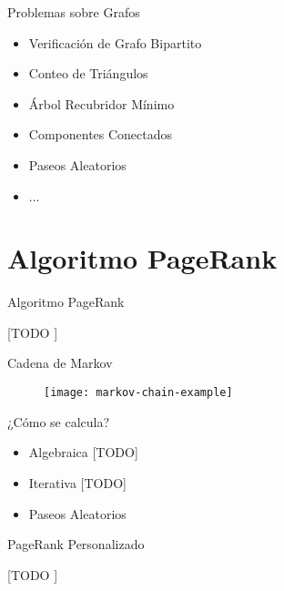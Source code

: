 \documentclass[12pt]{beamer}
\begin{document}
    \begin{frame}[fragile]{Problemas sobre Grafos}

      \begin{itemize}
        \item Verificación de Grafo Bipartito
        \item Conteo de Triángulos
        \item Árbol Recubridor Mínimo
        \item Componentes Conectados
        \item Paseos Aleatorios
        \item ...
      \end{itemize}

    \end{frame}

  \section{Algoritmo PageRank}

    \begin{frame}[fragile]{Algoritmo PageRank}

      [TODO ]

    \end{frame}

    \begin{frame}[fragile]{Cadena de Markov}

      \begin{figure}
        \texttt{[image: markov-chain-example]}
        \caption{}
        \label{}
      \end{figure}

    \end{frame}

    \begin{frame}[fragile]{¿Cómo se calcula?}

      \begin{itemize}
        \item Algebraica [TODO]
        \item Iterativa [TODO]
        \item Paseos Aleatorios
      \end{itemize}

    \end{frame}

    \begin{frame}[fragile]{PageRank Personalizado}

      [TODO ]

    \end{frame}
\end{document}
